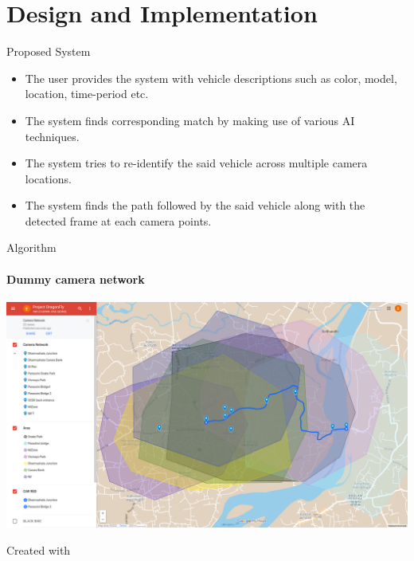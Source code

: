\documentclass{beamer}
\newcommand{\link}[2]{\href{#1}{\textit{\color{blue}{#2}}}}%
\begin{document}
	
	
	\section{Design and Implementation}
	\begin{frame}{Proposed System}
		\begin{itemize}
			\item The user provides the system with vehicle descriptions such as color, model, location, time-period etc. 
			\item The system finds corresponding match by making use of various AI techniques. 
			\item The system tries to re-identify the said vehicle across multiple camera locations.
			\item The system finds the path followed by the said vehicle along with the detected frame at each camera points.
		\end{itemize}
	\end{frame}

	\begin{frame}{Algorithm}
		\framesubtitle{Dummy camera network}
		\begin{center}
			\includegraphics[height=0.7\textheight]{res/camera_network_demo.png}
		\end{center}
		Created with \link{https://www.google.com/maps/d/edit?mid=1s2ST5x4nn-EK3JqU-c9EEGASRq5Ini0&usp=sharing}{Google Maps}
	\end{frame}
	
\end{document}
